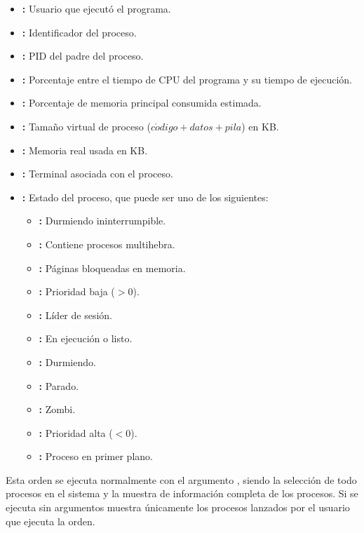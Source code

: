 \begin{itemize}
	\item{}\textbf{:} Usuario que ejecutó el programa.
	\item{}\textbf{:} Identificador del proceso.
	\item{}\textbf{:} PID del padre del proceso.
	\item{}\textbf{:} Porcentaje entre el tiempo de CPU del programa y su tiempo de ejecución.
	\item{}\textbf{:} Porcentaje de memoria principal consumida estimada.
	\item{}\textbf{:} Tamaño virtual de proceso ($c\acute{o}digo+datos+pila$) en KB\@.
	\item{}\textbf{:} Memoria real usada en KB\@.
	\item{}\textbf{:} Terminal asociada con el proceso.
	\item{}\textbf{:} Estado del proceso, que puede ser uno de los siguientes:
	\begin{itemize}
		\item{}\textbf{:} Durmiendo ininterrumpible.
		\item{}\textbf{:} Contiene procesos multihebra.
		\item{}\textbf{:} Páginas bloqueadas en memoria.
		\item{}\textbf{:} Prioridad baja ($>0$).
		\item{}\textbf{:} Líder de sesión.
		\item{}\textbf{:} En ejecución o listo.
		\item{}\textbf{:} Durmiendo.
		\item{}\textbf{:} Parado.
		\item{}\textbf{:} Zombi.
		\item\code{<}\textbf{:} Prioridad alta ($<0$).
		\item\code{+}\textbf{:} Proceso en primer plano.
	\end{itemize}
\end{itemize}

Esta orden se ejecuta normalmente con el argumento , siendo  la selección de todo procesos en el sistema y  la muestra de información completa de los procesos.
Si se ejecuta sin argumentos muestra únicamente los procesos lanzados por el usuario que ejecuta la orden.

\subsubsection{}

